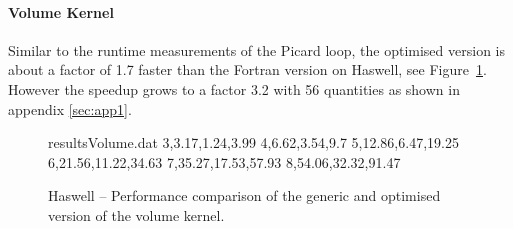 \documentclass{acm_proc_article-sp}
\begin{document}

\paragraph{Volume Kernel}
Similar to the runtime measurements of the Picard loop, the optimised version is about a factor of 1.7 faster than the Fortran version on Haswell, see Figure~\ref{fig:resultsVolume}. However the speedup grows to a factor 3.2 with 56 quantities as shown in appendix \ref{sec:app1}.

\begin{figure}
\begin{filecontents}{resultsVolume.dat}
3,3.17,1.24,3.99
4,6.62,3.54,9.7
5,12.86,6.47,19.25
6,21.56,11.22,34.63
7,35.27,17.53,57.93
8,54.06,32.32,91.47
\end{filecontents}
\caption{Haswell -- Performance comparison of the generic and optimised version of the volume kernel.}\label{fig:resultsVolume}
\end{figure}
\end{document}
